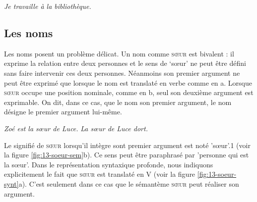 \ea\label{ex:travailler} \textit{Je travaille à la bibliothèque.}\z

\subsection{Les noms} 
Les noms posent un problème délicat. Un nom comme \textsc{sœur} est bivalent : il exprime la relation entre deux personnes et le sens de ‘sœur’ ne peut être défini sans faire intervenir ces deux personnes. Néanmoins son premier argument ne peut être exprimé que lorsque le nom est translaté en verbe comme en a. Lorsque \textsc{sœur} occupe une position nominale, comme en  b, seul son deuxième argument est exprimable. On dit, dans ce cas, que le nom  son premier argument, le nom désigne le premier argument lui-même.

\ea\label{ex:13-soeur}
\ea \textit{Zoé est la sœur de Luce.}
\ex \textit{La sœur de Luce dort.}\z\z

Le signifié de \textsc{sœur} lorsqu'il intègre sont premier argument est noté 'sœur'.1 (voir la figure \ref{fig:13-soeur-sem}b). Ce sens peut être paraphrasé par 'personne qui est la sœur'. Dans le représentation syntaxique profonde, nous indiquons explicitement le fait que \textsc{sœur} est translaté en V (voir la figure \ref{fig:13-soeur-synt}a). C'est seulement dans ce cas que le sémantème \textsc{sœur} peut réaliser son argument.

